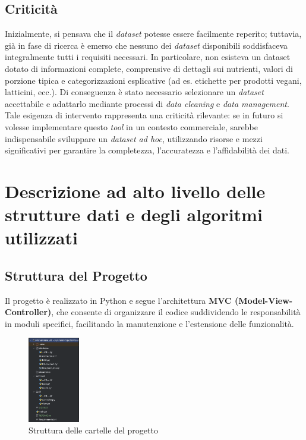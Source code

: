 \documentclass[11pt,a4paper]{article}
\begin{document}
\subsection{Criticità}
Inizialmente, si pensava che il \textit{dataset} potesse essere facilmente reperito; tuttavia, già in fase di ricerca è emerso che nessuno dei \textit{dataset} disponibili soddisfaceva integralmente tutti i requisiti necessari. In particolare, non esisteva un dataset dotato di informazioni complete, comprensive di dettagli sui nutrienti, valori di porzione tipica e categorizzazioni esplicative (ad es. etichette per prodotti vegani, latticini, ecc.). Di conseguenza è stato necessario selezionare un \textit{dataset} accettabile e adattarlo mediante processi di \textit{data cleaning} e \textit{data management}. Tale esigenza di intervento rappresenta una criticità rilevante: se in futuro si volesse implementare questo \textit{tool} in un contesto commerciale, sarebbe indispensabile sviluppare un \textit{dataset ad hoc}, utilizzando risorse e mezzi significativi per garantire la completezza, l’accuratezza e l’affidabilità dei dati.



\section{Descrizione ad alto livello delle strutture dati e degli algoritmi utilizzati}

\subsection{Struttura del Progetto}
Il progetto è realizzato in Python e segue l'architettura \textbf{MVC (Model-View-Controller)}, che consente di organizzare il codice suddividendo le responsabilità in moduli specifici, facilitando la manutenzione e l'estensione delle funzionalità.

\begin{figure}[h!]
    \centering
    \includegraphics[width=0.2\textwidth]{file_tree.png}
    \caption{Struttura delle cartelle del progetto}
    \label{fig:file_tree}
\end{figure}
\end{document}

